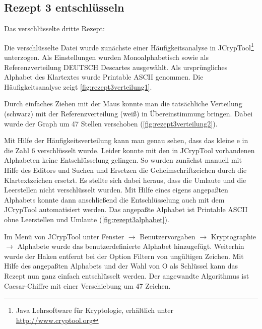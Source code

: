\subsection{Rezept 3 entschlüsseln}
\label{RezeptDreiEntschluesseln}

Das verschlüsselte dritte Rezept:

{\tiny
  
}

Die verschlüsselte Datei wurde zunächste einer Häufigkeitsanalyse in
JCrypTool\footnote{Java Lehrsoftware für Kryptologie, erhältlich unter
  \url{http://www.cryptool.org}} unterzogen. Als Einstellungen wurden
\glqq{}Monoalphabetisch\grqq{} sowie als Referenzverteilung \glqq{}DEUTSCH Descartes\grqq{}
ausgewählt. Als ursprüngliches Alphabet des Klartextes wurde \glqq{}Printable ASCII\grqq{} 
genommen. Die Häufigkeitsanalyse zeigt \cref{fig:rezept3verteilung1}.


Durch einfaches Ziehen mit der Maus konnte man die tatsächliche Verteilung
(schwarz) mit der Referenzverteilung (weiß) in Übereinstimmung bringen. Dabei
wurde der Graph um 47 Stellen verschoben (\cref{fig:rezept3verteilung2}).


Mit Hilfe der Häufigkeitsverteilung kann man genau sehen, dass das kleine \glqq{}e\grqq{} 
in die Zahl \glqq{}6\grqq{} verschlüsselt wurde. Leider konnte mit den in JCrypTool
vorhandenen Alphabeten keine Entschlüsselung gelingen. So wurden zunächst
manuell mit Hilfe des Editors und Suchen und Ersetzen die Geheimschriftzeichen
durch die Klartextzeichen ersetzt. Es stellte sich dabei heraus, dass die
Umlaute und die Leerstellen nicht verschlüsselt wurden. Mit Hilfe eines eigens
angepaßten Alphabets konnte dann anschließend die Entschlüsselung auch mit dem
JCrypTool automatisiert werden. Das angepaßte Alphabet ist Printable ASCII ohne
Leerstellen und Umlaute (\cref{fig:rezept3alphabet}).


Im Menü von JCrypTool unter Fenster $\rightarrow$ Benutzervorgaben $\rightarrow$
Kryptographie $\rightarrow$ Alphabete wurde das benutzerdefinierte Alphabet
hinzugefügt. Weiterhin wurde der Haken entfernt bei der Option \glqq{}Filtern von
ungültigen Zeichen\grqq{}.  Mit Hilfe des angepaßten Alphabets und der Wahl von \glqq{}O\grqq{}
als Schlüssel kann das Rezept nun ganz einfach entschlüsselt werden.  Der
angewandte Algorithmus ist Caesar-Chiffre mit einer Verschiebung um 47 Zeichen.

